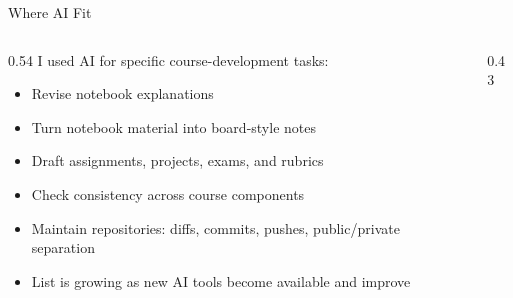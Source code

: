 \documentclass[aspectratio=169,11pt]{beamer}
\begin{document}
\begin{frame}{Where AI Fit}
  \begin{columns}[T,totalwidth=\textwidth]
    \begin{column}{0.54\textwidth}
      I used AI for specific course-development tasks:
      \begin{itemize}
        \item Revise notebook explanations
        \item Turn notebook material into board-style notes
        \item Draft assignments, projects, exams, and rubrics
        \item Check consistency across course components
        \item Maintain repositories: diffs, commits, pushes, public/private separation
        \item List is growing as new AI tools become available and improve 
      \end{itemize}
    \end{column}
    \begin{column}{0.43\textwidth}
      \centering
    \end{column}
  \end{columns}
\end{frame}
\end{document}
